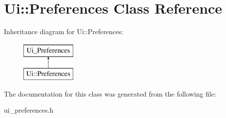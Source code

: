 \hypertarget{classUi_1_1Preferences}{
\section{Ui::Preferences Class Reference}
\label{classUi_1_1Preferences}
}
Inheritance diagram for Ui::Preferences:\begin{figure}[H]
\begin{center}
\leavevmode
\includegraphics[height=2.000000cm]{classUi_1_1Preferences}
\end{center}
\end{figure}


The documentation for this class was generated from the following file:\begin{DoxyCompactItemize}
\item 
ui\_\-preferences.h\end{DoxyCompactItemize}
